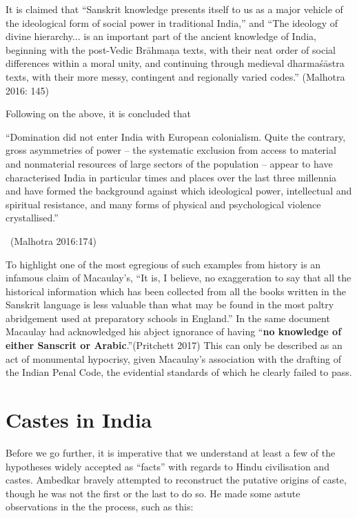 It is claimed that “Sanskrit knowledge presents itself to us as a major vehicle of the ideological form of social power in traditional India,” and “The ideology of divine hierarchy... is an important part of the ancient knowledge of India, beginning with the post-Vedic Brāhmaṇa texts, with their neat order of social differences within a moral unity, and continuing through medieval dharmaśāstra texts, with their more messy, contingent and regionally varied codes.” (Malhotra 2016: 145)

Following on the above, it is concluded that

\begin{myquote}
“Domination did not enter India with European colonialism. Quite the contrary, gross asymmetries of power – the systematic exclusion from access to material and nonmaterial resources of large sectors of the population – appear to have characterised India in particular times and places over the last three millennia and have formed the background against which ideological power, intellectual and spiritual resistance, and many forms of physical and psychological violence crystallised.” 

~\hfill (Malhotra 2016:174)
\end{myquote}

To highlight one of the most egregious of such examples from history is an infamous claim of Macaulay’s, “It is, I believe, no exaggeration to say that all the historical information which has been collected from all the books written in the Sanskrit language is less valuable than what may be found in the most paltry abridgement used at preparatory schools in England.” In the same document Macaulay had acknowledged his abject ignorance of having “\textbf{no knowledge of either Sanscrit or Arabic}.”(Pritchett 2017) This can only be described as an act of monumental hypocrisy, given Macaulay's association with the drafting of the Indian Penal Code, the evidential standards of which he clearly failed to pass.


\section*{Castes in India}

Before we go further, it is imperative that we understand at least a few of the hypotheses widely accepted as “facts” with regards to Hindu civilisation and castes. Ambedkar bravely attempted to reconstruct the putative origins of caste, though he was not the first or the last to do so. He made some astute observations in the the process, such as this:

